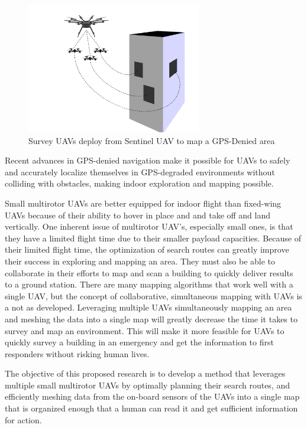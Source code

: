 \documentclass[12pt, letterpaper]{article}
\begin{document}
\begin{figure}[h] %
	\centering
	\includegraphics[trim = 0mm 0mm 0mm 0mm,clip,width=3in]{survey_drone_illustration.png}
	\caption{Survey UAVs deploy from Sentinel UAV to map a GPS-Denied area}
	\label{fig:sentinel_survey}
\end{figure}

Recent advances in GPS-denied navigation \cite{Wheeler2017} make it possible for UAVs to safely and accurately localize themselves in GPS-degraded environments without colliding with obstacles, making indoor exploration and mapping possible. 

Small multirotor UAVs are better equipped for indoor flight than fixed-wing UAVs because of their ability to hover in place and and take off and land vertically. One inherent issue of multirotor UAV's, especially small ones, is that they have a limited flight time due to their smaller payload capacities. Because of their limited flight time, the optimization of search routes can greatly improve their success in exploring and mapping an area. They must also be able to collaborate in their efforts to map and scan a building to quickly deliver results to a ground station. There are many mapping algorithms that work well with a single UAV, but the concept of collaborative, simultaneous mapping with UAVs is a not as developed. Leveraging multiple UAVs simultaneously mapping an area and meshing the data into a single map will greatly decrease the time it takes to survey and map an environment. This will make it more feasible for UAVs to quickly survey a building in an emergency and get the information to first responders without risking human lives.

The objective of this proposed research is to develop a method that leverages multiple small multirotor UAVs by optimally planning their search routes, and efficiently meshing data from the on-board sensors of the UAVs into a single map that is organized enough that a human can read it and get sufficient information for action. 
\end{document}
